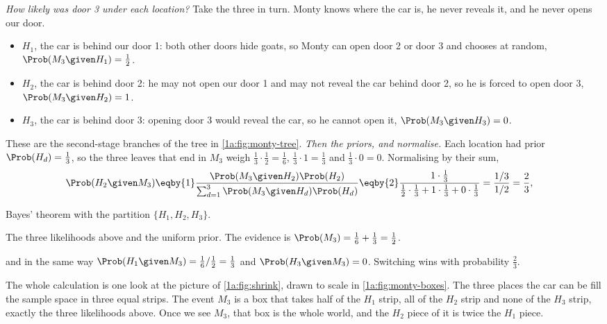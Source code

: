 \emph{How likely was door 3 under each location?} Take the three in turn. Monty
knows where the car is, he never reveals it, and he never opens our door.
\begin{itemize}[leftmargin=1.5em,itemsep=1pt]
  \item $H_1$, the car is behind our door 1: both other doors hide goats, so
        Monty can open door 2 or door 3 and chooses at random,
        $\Prob(M_3\given H_1)=\tfrac12$.
  \item $H_2$, the car is behind door 2: he may not open our door 1 and may
        not reveal the car behind door 2, so he is forced to open door 3,
        $\Prob(M_3\given H_2)=1$.
  \item $H_3$, the car is behind door 3: opening door 3 would reveal the car,
        so he cannot open it, $\Prob(M_3\given H_3)=0$.
\end{itemize}
These are the second-stage branches of the tree in \cref{1a:fig:monty-tree}.
\emph{Then the priors, and normalise.} Each location had prior $\Prob(H_d)=\tfrac13$, so
the three leaves that end in $M_3$ weigh $\tfrac13\cdot\tfrac12=\tfrac16$,
$\tfrac13\cdot1=\tfrac13$ and $\tfrac13\cdot0=0$. Normalising by their sum,
\begin{align*}
\Prob(H_2\given M_3)
&\eqby{1}\frac{\Prob(M_3\given H_2)\Prob(H_2)}{\sum_{d=1}^3\Prob(M_3\given H_d)\Prob(H_d)}
 \eqby{2}\frac{1\cdot\tfrac13}{\tfrac12\cdot\tfrac13+1\cdot\tfrac13+0\cdot\tfrac13}
 =\frac{1/3}{1/2}=\frac23,
\end{align*}
\begin{explain}
  \item Bayes' theorem with the partition $\{H_1,H_2,H_3\}$.
  \item The three likelihoods above and the uniform prior. The evidence is
        $\Prob(M_3)=\tfrac16+\tfrac13=\tfrac12$.
\end{explain}
and in the same way $\Prob(H_1\given M_3)=\tfrac16/\tfrac12=\tfrac13$ and
$\Prob(H_3\given M_3)=0$. Switching wins with probability $\tfrac23$.

The whole calculation is one look at the picture of \cref{1a:fig:shrink}, drawn
to scale in \cref{1a:fig:monty-boxes}. The three places the car can be fill the
sample space in three equal strips. The event $M_3$ is a box that takes half of
the $H_1$ strip, all of the $H_2$ strip and none of the $H_3$ strip, exactly the
three likelihoods above. Once we see $M_3$, that box is the whole world, and the
$H_2$ piece of it is twice the $H_1$ piece.

